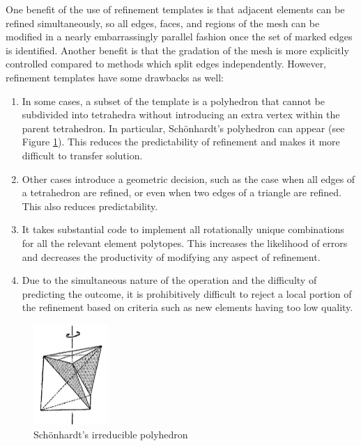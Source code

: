 One benefit of the use of refinement templates is that adjacent elements can be refined
simultaneously, so all edges, faces, and regions of the mesh can be modified in
a nearly embarrassingly parallel fashion once the set of marked edges is identified.
Another benefit is that the gradation of the mesh is more explicitly controlled
compared to methods which split edges independently.
However, refinement templates have some drawbacks as well:
\begin{enumerate}
\item In some cases, a subset of the template is a polyhedron that cannot be
subdivided into tetrahedra without introducing an extra vertex within the
parent tetrahedron.
In particular, Sch{\"o}nhardt's polyhedron can appear (see Figure
\ref{fig:schonhardt}).
This reduces the predictability of refinement and makes it more difficult
to transfer solution.
\item Other cases introduce a geometric decision, such as the case
when all edges of a tetrahedron are refined, or even when two edges
of a triangle are refined. This also reduces predictability.
\item It takes substantial code to implement all rotationally unique
combinations for all the relevant element polytopes.
This increases the likelihood of errors and decreases the productivity
of modifying any aspect of refinement.
\item Due to the simultaneous nature of the operation and the difficulty
of predicting the outcome, it is prohibitively difficult to reject
a local portion of the refinement based on criteria such as new elements
having too low quality.
\end{enumerate}

\begin{figure}
\begin{center}
\includegraphics[width=0.25\textwidth]{schonhardt.png}
\caption{Sch{\"o}nhardt's irreducible polyhedron
\cite{Schonhardt1928}}
\label{fig:schonhardt}
\end{center}
\end{figure}

